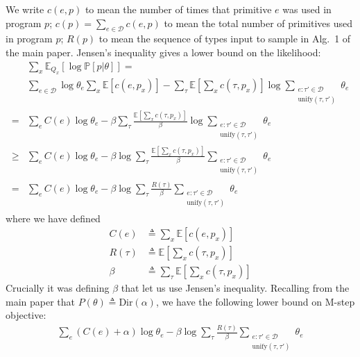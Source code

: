 \documentclass{article}
\newcommand{\expect}{\mathds{E}} %
\newcommand{\probability}{\mathds{P}} %
\begin{document}
We write $c(e,p)$ to mean the number of times that primitive $e$ was used in program $p$; $c(p)= \sum_{e\in \mathcal{D}}c(e,p)$ to mean the total number of primitives used in program $p$; $R(p)$ to mean the sequence of types input to sample in Alg.~1 of the main paper. Jensen's inequality gives a lower bound on the likelihood:
\begin{align*}
  &\sum_x\expect_{Q_x}\left[  \log \probability[p|\theta] \right] =\\
  &\sum_{e\in \mathcal{D}} \log \theta_e \sum_x\expect\left[c(e,p_x) \right] -
  \sum_\tau\expect\left[\sum_x c(\tau,p_x)  \right]\log \sum_{\substack{e:\tau'\in \mathcal{D}\\\text{unify}(\tau,\tau')}}\theta_e  \\
 =   &\sum_e C(e)\log \theta_e  - \beta\sum_\tau\frac{\expect\left[\sum_x c(\tau,p_x)  \right]}{\beta}\log \sum_{\substack{e:\tau'\in \mathcal{D}\\\text{unify}(\tau,\tau')}}\theta_e  \\
 \geq    &\sum_e C(e)\log \theta_e  - \beta\log \sum_\tau\frac{\expect\left[\sum_x c(\tau,p_x)  \right]}{\beta}\sum_{\substack{e:\tau'\in \mathcal{D}\\\text{unify}(\tau,\tau')}}\theta_e  \\
     =     &\sum_e C(e)\log \theta_e  - \beta\log \sum_\tau\frac{R(\tau)}{\beta}\sum_{\substack{e:\tau'\in \mathcal{D}\\\text{unify}(\tau,\tau')}}\theta_e  
\end{align*}
where we have defined
\begin{align*}
  C(e)&\triangleq  \sum_x\expect\left[c(e,p_x) \right]\\
  R(\tau)&\triangleq \expect\left[\sum_x c(\tau,p_x)  \right]\\
  \beta&\triangleq\sum_\tau \expect\left[\sum_x c(\tau,p_x)  \right]
\end{align*}
Crucially it was defining $\beta$ that let us use Jensen's inequality. 
Recalling from the main paper that $P(\theta)\triangleq\text{Dir}(\alpha)$,
we have the following lower bound on M-step objective:
\begin{align}
\sum_e (C(e) + \alpha)\log \theta_e  - \beta\log \sum_\tau\frac{R(\tau)}{\beta}\sum_{\substack{e:\tau'\in \mathcal{D}\\\text{unify}(\tau,\tau')}}\theta_e    
\end{align}
\end{document}
